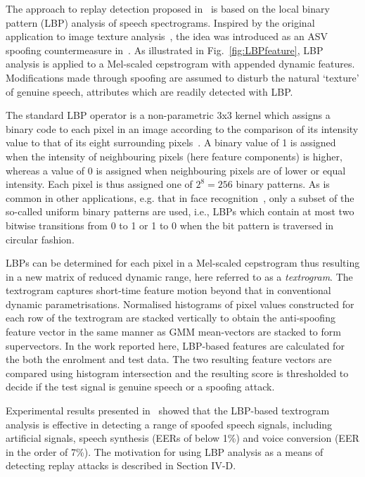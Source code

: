 The approach to replay detection proposed in~\cite{Alegre2014} is based on the local binary pattern (LBP) analysis of speech spectrograms.  
Inspired by the original application to image texture analysis~\cite{Ojala2002}, the idea was introduced as an ASV spoofing countermeasure in~\cite{Alegre2013a}.  
As illustrated in Fig.~\ref{fig:LBPfeature}, LBP analysis is applied to a Mel-scaled cepstrogram with appended dynamic features.  Modifications made through spoofing are assumed to disturb the natural `texture' of genuine speech, attributes which are readily detected with LBP.   

The standard LBP operator is a non-parametric 3x3 kernel which assigns a binary code to each pixel in an image according to the comparison of its intensity value to that of its eight surrounding pixels~\cite{Ojala2002}. 
A binary value of 1 is assigned when the intensity of neighbouring pixels (here feature components) is higher, whereas a value of 0 is assigned when neighbouring pixels are of lower or equal intensity. Each pixel is thus assigned one of $2^8=256$ binary patterns. As is common in other applications, e.g. that in face recognition~\cite{Ahonen2006}, only a subset of the so-called uniform binary patterns are used, i.e.,  LBPs which contain at most two bitwise transitions from 0 to 1 or 1 to 0 when the bit pattern is traversed in circular fashion.

LBPs can be determined for each pixel in a Mel-scaled cepstrogram thus resulting in a new matrix of reduced dynamic range, here referred to as a \emph{textrogram}.  
The textrogram captures short-time feature motion beyond that in conventional dynamic parametrisations.  
Normalised histograms of pixel values constructed for each row of the textrogram   are stacked vertically to obtain the anti-spoofing feature vector in the same manner as GMM mean-vectors are stacked to form supervectors.  
In the work reported here, LBP-based features are calculated for the both the enrolment and test data.  The two resulting feature vectors are compared using histogram intersection and the resulting score is thresholded to decide if the test signal is genuine speech or a spoofing attack.

Experimental results presented in~\cite{Alegre2013a} showed that the LBP-based textrogram analysis is effective in detecting a range of spoofed speech signals, including artificial signals, speech synthesis (EERs of below 1\%) and voice conversion (EER in the order of 7\%).  The motivation for using LBP analysis as a means of detecting replay attacks is described in Section IV-D.
